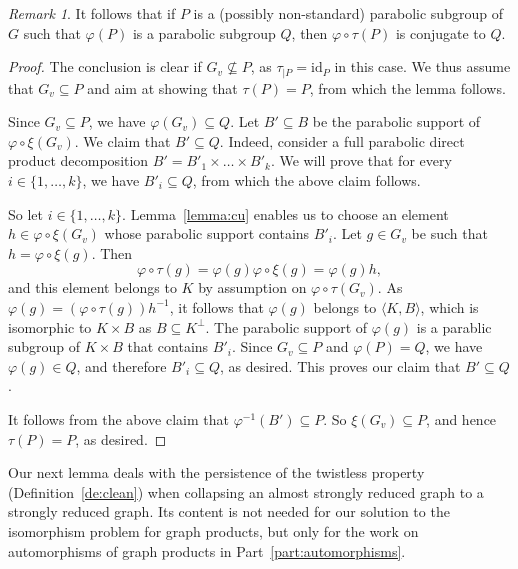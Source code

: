 \documentclass[a4paper,english,11pt]{article}
\theoremstyle{definition}
\theoremstyle{remark}
\newtheorem{rk}[de]{Remark}
\newcommand{\twistor}{\xi}
\begin{document}
\begin{rk}\label{Rk:redress}
It follows that if $P$ is a (possibly non-standard) parabolic subgroup of $G$ such that $\varphi(P)$ is a parabolic subgroup $Q$, then $\varphi\circ\tau(P)$ is conjugate to $Q$.
\end{rk}

\begin{proof}
The conclusion is clear if $G_v \not\subseteq P$, as $\tau_{|P}=\mathrm{id}_P$ in this case. We thus assume that $G_v\subseteq P$ and aim at showing that $\tau(P)=P$, from which the lemma follows.

Since $G_v\subseteq P$, we have $\varphi(G_v)\subseteq Q$. Let $B'\subseteq B$ be the parabolic support of $\varphi\circ\twistor(G_v)$. We claim that $B'\subseteq Q$. Indeed, consider a full parabolic direct product decomposition $B'=B'_1\times\dots\times B'_k$. We will prove that for every $i\in\{1,\dots,k\}$, we have $B'_i\subseteq Q$, from which the above claim follows.

So let $i\in\{1,\dots,k\}$. Lemma~\ref{lemma:cu} enables us to choose an element $h\in\varphi\circ\twistor(G_v)$ whose parabolic support contains $B'_i$. Let $g\in G_v$ be such that $h=\varphi\circ\twistor(g)$. Then 
\begin{equation*}
    \varphi\circ\tau(g)=\varphi(g) \varphi\circ\twistor(g)=\varphi(g)h,
\end{equation*}
and this element belongs to $K$ by assumption on $\varphi\circ\tau(G_v)$. 
As $\varphi(g)=(\varphi\circ\tau(g))h^{-1}$, it follows that $\varphi(g)$
belongs to $\langle K,B\rangle$, which is isomorphic to $K\times B$ as
$B\subseteq K^\perp$. The parabolic support of $\varphi(g)$ is a parablic
subgroup of $K\times B$ that contains $B'_i$.
Since $G_v\subseteq P$ and $\varphi(P)=Q$, we have $\varphi(g)\in Q$, and therefore $B'_i\subseteq Q$, as desired. This proves our claim that $B'\subseteq Q$.

It follows from the above claim that $\varphi^{-1}(B')\subseteq P$. So $\twistor(G_v)\subseteq P$, and hence $\tau(P)=P$, as desired.
\end{proof}

Our next lemma deals with the persistence of the twistless property (Definition~\ref{de:clean}) when collapsing an almost strongly reduced graph to a strongly reduced graph. Its content is not needed for our solution to the isomorphism problem for graph products, but only for the work on automorphisms of graph products in Part~\ref{part:automorphisms}.
\end{document}
